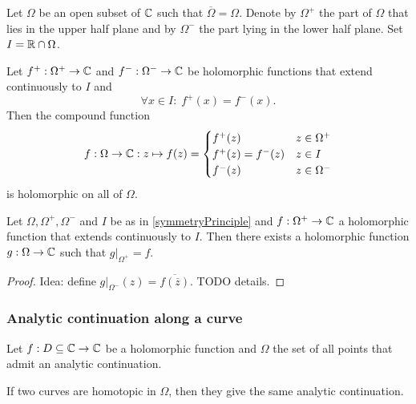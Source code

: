 \begin{proposition} \label{symmetryPrinciple}
Let $\Omega$ be an open subset of $\mathbb{C}$ such that $\overline{\Omega} = \Omega$. Denote by $\Omega^+$ the part of $\Omega$ that lies in the upper half plane and by $\Omega^-$ the part lying in the lower half plane. Set $I = \mathbb{R} \cap \Omega$.

Let $f^+: \Omega^+ \to \mathbb{C}$ and $f^-: \Omega^- \to \mathbb{C}$ be holomorphic functions that extend continuously to $I$ and
\[ \forall x\in I: \; f^+(x) = f^-(x). \]
Then the compound function
\[ f: \Omega \to \mathbb{C}: z\mapsto f(z) = \begin{cases}
f^+(z) & z\in \Omega^+ \\
f^+(z) = f^-(z) & z\in I \\
f^-(z) & z\in \Omega^-
\end{cases} \]
is holomorphic on all of $\Omega$.
\end{proposition}

\begin{proposition}
Let $\Omega, \Omega^+, \Omega^-$ and $I$ be as in \ref{symmetryPrinciple} and $f: \Omega^+ \to \mathbb{C}$ a holomorphic function that extends continuously to $I$. Then there exists a holomorphic function $g: \Omega\to \mathbb{C}$ such that $g|_{\Omega^+} = f$.
\end{proposition}
\begin{proof}
Idea: define $g|_{\Omega^-}(z) = \overline{f(\overline{z})}$. TODO details.
\end{proof}

\subsubsection{Analytic continuation along a curve}
\begin{theorem}
Let $f:D\subseteq \mathbb{C} \to \mathbb{C}$ be a holomorphic function and $\Omega$ the set of all points that admit an analytic continuation.

If two curves are homotopic in $\Omega$, then they give the same analytic continuation.
\end{theorem}

